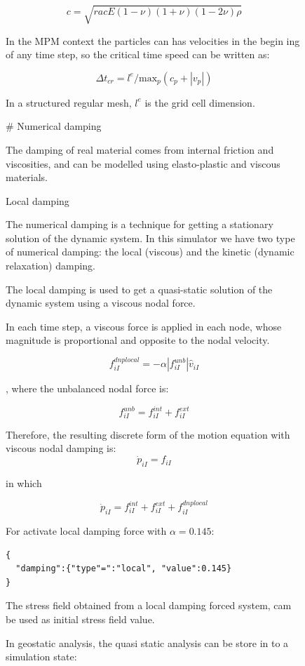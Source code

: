 \documentclass[11pt,a4paper]{article}
\begin{document}
\begin{figure}[h]
$$ c = \sqrt{  rac {E (1-\nu)} {(1+\nu)(1-2\nu)\rho}} $$

In the MPM context the particles can has velocities in the begin ing of any time step, so the critical time speed can be written as:

$$ \Delta t_{cr} = l^e / \text{max}_p ( c_p +  |v_p| ) $$

In a structured regular mesh,  $ l^e  $ is the grid cell dimension.

# Numerical damping

The damping of real material comes from internal friction and viscosities, and can be modelled using elasto-plastic and viscous materials.



Local damping

The numerical damping is a technique for getting a stationary solution of the dynamic system. In this simulator we have two type of numerical damping: the local (viscous) and the kinetic (dynamic relaxation) damping.

The local damping is used to get a quasi-static solution of the dynamic system using a viscous nodal force.

In each time step, a viscous force is applied in each node, whose magnitude is proportional and opposite to the nodal velocity.

$$ f_{iI}^{dnplocal} = - \alpha |f_{iI}^{unb}| \hat{v}_{iI} $$

, where the unbalanced nodal force is:

$$ f_{iI}^{unb} =  f_{iI}^{int} + f_{iI}^{ext} $$

Therefore, the resulting discrete form of the motion equation with viscous nodal damping is:
$$ \dot{p}_{iI} = f_{iI} $$

in which
 
$$ \dot{p}_{iI} = f_{iI}^{int} + f_{iI}^{ext} + f_{iI}^{dnplocal} $$

For activate local damping force with  $ \alpha = 0.145  $:

\begin{lstlisting}[language={},caption={input JSON}]
{
  "damping":{"type"=":"local", "value":0.145}
}
\end{lstlisting}

The stress field obtained from a local damping forced system, cam be used as initial stress field value.

In geostatic analysis, the quasi static analysis can be store in to a simulation state:



\end{figure}
\end{document}
